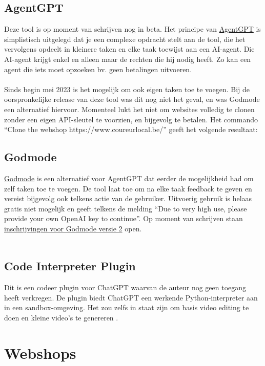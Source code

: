 \subsection{AgentGPT} 
Deze tool is op moment van schrijven nog in beta. Het principe van \href{https://agentgpt.reworkd.ai/nl}{AgentGPT} is simplistisch uitgelegd dat je een complexe opdracht stelt aan de tool, die het vervolgens opdeelt in kleinere taken en elke taak toewijst aan een AI-agent. Die AI-agent krijgt enkel en alleen maar de rechten die hij nodig heeft. Zo kan een agent die iets moet opzoeken bv. geen betalingen uitvoeren. 
\\\\
Sinds begin mei 2023 is het mogelijk om ook eigen taken toe te voegen. Bij de oorspronkelijke release van deze tool was dit nog niet het geval, en was Godmode een alternatief hiervoor. Momenteel lukt het niet om websites volledig te clonen zonder een eigen API-sleutel te voorzien, en bijgevolg te betalen. Het commando “Clone the webshop https://www.coureurlocal.be/” geeft het volgende resultaat:

\subsection{Godmode}
\href{https://godmode.space}{Godmode} is een alternatief voor AgentGPT dat eerder de mogelijkheid had om zelf taken toe te voegen. De tool laat toe om na elke taak feedback te geven en vereist bijgevolg ook telkens actie van de gebruiker. Uitvoerig gebruik is helaas gratis niet mogelijk en geeft telkens de melding “Due to very high use, please provide your own OpenAI key to continue”. Op moment van schrijven staan \href{https://docs.google.com/forms/d/e/1FAIpQLSdfKYSOEifsbKsfx365zZ0TuZpE9ovLUcAwpGY3NFNRg6l25w/viewform}{inschrijvingen voor Godmode versie 2} open.
\\\\
\subsection{Code Interpreter Plugin}
Dit is een codeer plugin voor ChatGPT waarvan de auteur nog geen toegang heeft verkregen. De plugin biedt ChatGPT een werkende Python-interpreter aan in een sandbox-omgeving. Het zou zelfs in staat zijn om basis video editing te doen en kleine video's te genereren \autocite{Jose2023}.
\section{Webshops}
